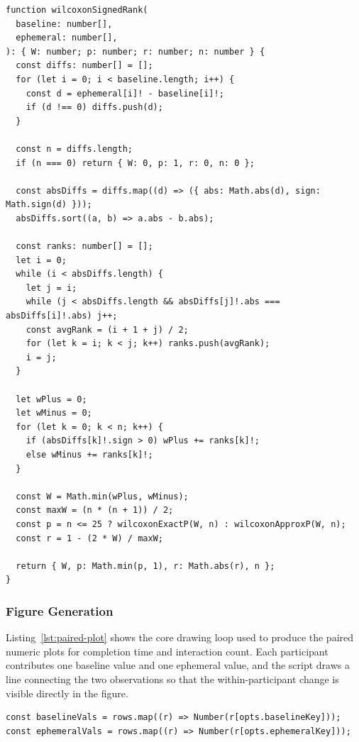 \begin{appendices}
\begin{listing}[htbp]
\caption{Core Wilcoxon signed-rank implementation used for paired outcomes.}
\label{lst:wilcoxon}
\begin{verbatim}
function wilcoxonSignedRank(
  baseline: number[],
  ephemeral: number[],
): { W: number; p: number; r: number; n: number } {
  const diffs: number[] = [];
  for (let i = 0; i < baseline.length; i++) {
    const d = ephemeral[i]! - baseline[i]!;
    if (d !== 0) diffs.push(d);
  }

  const n = diffs.length;
  if (n === 0) return { W: 0, p: 1, r: 0, n: 0 };

  const absDiffs = diffs.map((d) => ({ abs: Math.abs(d), sign: Math.sign(d) }));
  absDiffs.sort((a, b) => a.abs - b.abs);

  const ranks: number[] = [];
  let i = 0;
  while (i < absDiffs.length) {
    let j = i;
    while (j < absDiffs.length && absDiffs[j]!.abs === absDiffs[i]!.abs) j++;
    const avgRank = (i + 1 + j) / 2;
    for (let k = i; k < j; k++) ranks.push(avgRank);
    i = j;
  }

  let wPlus = 0;
  let wMinus = 0;
  for (let k = 0; k < n; k++) {
    if (absDiffs[k]!.sign > 0) wPlus += ranks[k]!;
    else wMinus += ranks[k]!;
  }

  const W = Math.min(wPlus, wMinus);
  const maxW = (n * (n + 1)) / 2;
  const p = n <= 25 ? wilcoxonExactP(W, n) : wilcoxonApproxP(W, n);
  const r = 1 - (2 * W) / maxW;

  return { W, p: Math.min(p, 1), r: Math.abs(r), n };
}
\end{verbatim}
\end{listing}

\subsubsection{Figure Generation}

Listing~\ref{lst:paired-plot} shows the core drawing loop used to produce the paired numeric plots for completion time and interaction count. Each participant contributes one baseline value and one ephemeral value, and the script draws a line connecting the two observations so that the within-participant change is visible directly in the figure.

\begin{listing}[htbp]
\caption{Core paired-plot drawing logic used for numeric result figures.}
\label{lst:paired-plot}
\begin{verbatim}
const baselineVals = rows.map((r) => Number(r[opts.baselineKey]));
const ephemeralVals = rows.map((r) => Number(r[opts.ephemeralKey]));


\end{verbatim}
\end{listing}
\end{appendices}
